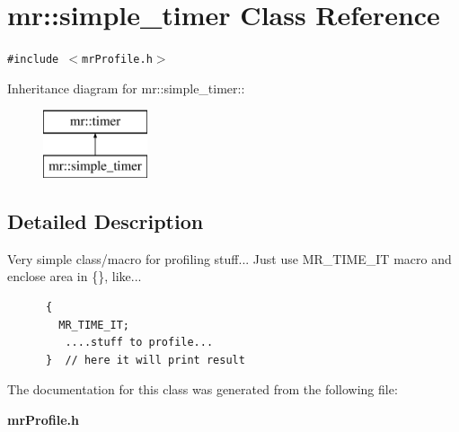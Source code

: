 \section{mr::simple\_\-timer Class Reference}
\label{classmr_1_1simple__timer}
{\tt \#include $<$mr\-Profile.h$>$}

Inheritance diagram for mr::simple\_\-timer::\begin{figure}[H]
\begin{center}
\leavevmode
\includegraphics[height=2cm]{classmr_1_1simple__timer}
\end{center}
\end{figure}


\subsection{Detailed Description}
Very simple class/macro for profiling stuff... Just use MR\_\-TIME\_\-IT macro and enclose area in \{\}, like...



\footnotesize\begin{verbatim}      {
        MR_TIME_IT;
         ....stuff to profile...
      }  // here it will print result
\end{verbatim}
\normalsize




The documentation for this class was generated from the following file:\begin{CompactItemize}
\item 
{\bf mr\-Profile.h}\end{CompactItemize}

